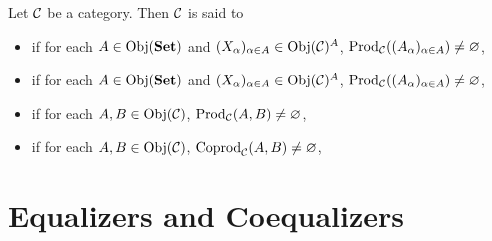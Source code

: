 \documentclass{book}
\begin{document}
	\begin{defn}
		Let $\mathcal{C}$ be a category. Then $\mathcal{C}$ is said to
		\begin{itemize}
			\item {} if for each $A \in \operatorname{Obj}(\text{\textbf{Set}})$ and $(X_{\alpha})_{\alpha \in A} \in \operatorname{Obj}(\mathcal{C})^A$, $\operatorname{Prod}_{\mathcal{C}}((A_{\alpha})_{\alpha \in A}) \neq \varnothing$,
			\item {} if for each $A \in \operatorname{Obj}(\text{\textbf{Set}})$ and $(X_{\alpha})_{\alpha \in A} \in \operatorname{Obj}(\mathcal{C})^A$, $\operatorname{Prod}_{\mathcal{C}}((A_{\alpha})_{\alpha \in A}) \neq \varnothing$,
			\item {} if for each $A, B \in \operatorname{Obj}(\mathcal{C})$, $\operatorname{Prod}_{\mathcal{C}}(A,B) \neq \varnothing$,
			\item {} if for each $A, B \in \operatorname{Obj}(\mathcal{C})$, $\operatorname{Coprod}_{\mathcal{C}}(A,B) \neq \varnothing$,
		\end{itemize}
	\end{defn}
	
	
	
	
	
	
	
	
	
	
	
	
	
	
	
	
	
	
	
	
	
	
	
	
	
	
	
	
	
	
	
	
	
	
	
	
	
	
	
	
	
	
	
	
	
	
	\newpage
	\section{Equalizers and Coequalizers}
	
	
\end{document}
